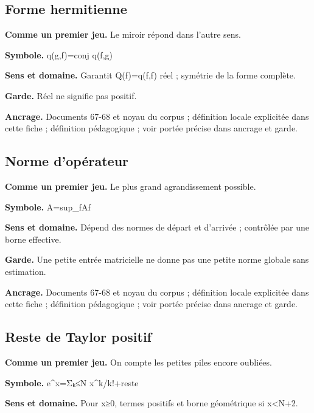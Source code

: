 \documentclass[
  9pt,
  a4paper,
]{article}
\begin{document}
\hypertarget{forme-hermitienne}{%
\subsection{Forme hermitienne}\label{forme-hermitienne}}

\textbf{Comme un premier jeu.} Le miroir répond dans l'autre sens.

\textbf{Symbole.} q(g,f)=conj q(f,g)

\textbf{Sens et domaine.} Garantit Q(f)=q(f,f) réel ; symétrie de la
forme complète.

\textbf{Garde.} Réel ne signifie pas positif.

\textbf{Ancrage.} Documents 67-68 et noyau du corpus ; définition locale
explicitée dans cette fiche ; définition pédagogique ; voir portée
précise dans ancrage et garde.

\hypertarget{norme-dopuxe9rateur}{%
\subsection{Norme d'opérateur}\label{norme-dopuxe9rateur}}

\textbf{Comme un premier jeu.} Le plus grand agrandissement possible.

\textbf{Symbole.}
\textbar\textbar A\textbar\textbar=sup\_\textbar\textbar f\textbar{}\textbar\textbar Af\textbar\textbar{}

\textbf{Sens et domaine.} Dépend des normes de départ et d'arrivée ;
contrôlée par une borne effective.

\textbf{Garde.} Une petite entrée matricielle ne donne pas une petite
norme globale sans estimation.

\textbf{Ancrage.} Documents 67-68 et noyau du corpus ; définition locale
explicitée dans cette fiche ; définition pédagogique ; voir portée
précise dans ancrage et garde.

\hypertarget{reste-de-taylor-positif}{%
\subsection{Reste de Taylor positif}\label{reste-de-taylor-positif}}

\textbf{Comme un premier jeu.} On compte les petites piles encore
oubliées.

\textbf{Symbole.} e\^{}x=Σₖ≤N x\^{}k/k!+reste

\textbf{Sens et domaine.} Pour x≥0, termes positifs et borne géométrique
si x\textless N+2.
\end{document}
